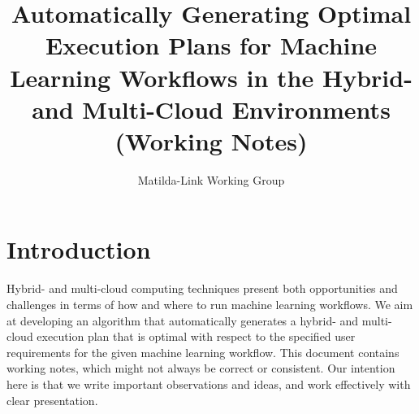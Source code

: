 \documentclass[runningheads]{llncs}
\begin{document}
%
\title{Automatically Generating Optimal Execution Plans for Machine Learning Workflows in the Hybrid- and Multi-Cloud Environments (Working Notes)}
%
%
\author{Matilda-Link Working Group}
%
%
%
\maketitle              %

\section{Introduction}
Hybrid- and multi-cloud computing techniques present both opportunities and challenges in terms of how and where to run machine learning workflows. We aim at developing an algorithm that automatically generates a hybrid- and multi-cloud execution plan that is optimal with respect to the specified user requirements for the given machine learning workflow. This document contains working notes, which might not always be correct or consistent. Our intention here is that we write important observations and ideas, and work effectively with clear presentation.
\end{document}
